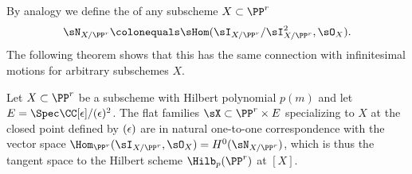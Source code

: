 By analogy we define the
 of any subscheme $X\subset
\index{normal sheaf}%
\PP^r$
$$
\sN_{X/\PP^r} \colonequals  \sHom(\sI_{X/\PP^r}/\sI_{X/\PP^r}^2, \sO_X).
$$
The following theorem shows that this
has the same connection with infinitesimal motions for arbitrary
subschemes $X$.

\begin{theorem}
\label{tangent space of Hilb}
Let $X\subset \PP^r$ be a subscheme with Hilbert polynomial $p(m)$ and let
$E = \Spec\CC[\eps]/(\eps)^{2}$. The flat families
$\sX \subset \PP^r\times E$ specializing to $X$ at the closed point
defined by $(\eps)$
are in natural one-to-one correspondence with the vector space
%
$\Hom_{\PP^r}(\sI_{X/\PP^r}, \sO_X) = H^0(\sN_{X/\PP^r})$, which is thus
the tangent space to the Hilbert scheme $\Hilb_{p}(\PP^r)$ at $[X]$.
\end{theorem}

